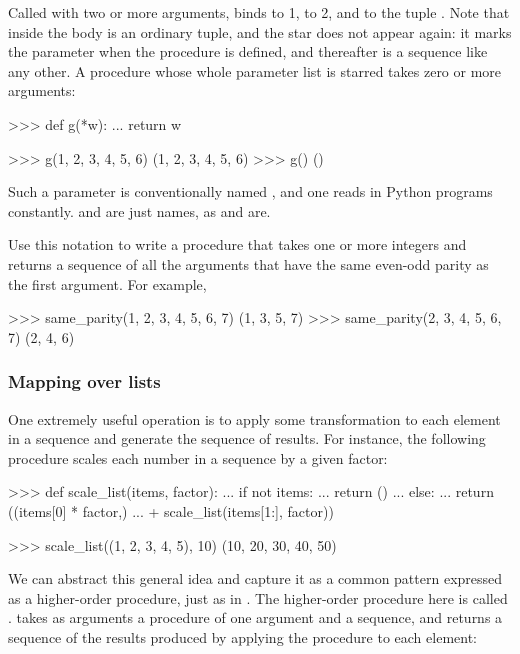 \begin{exerciseGroup}
\noindent
Called with two or more arguments,  binds  to 1,  to 2,
and  to the tuple .  Note that inside the body
 is an ordinary tuple, and the star does not appear again: it marks the
parameter when the procedure is defined, and thereafter  is a sequence
like any other.  A procedure whose whole parameter list is starred takes zero
or more arguments:

\begin{codeBlock}
>>> def g(*w):
...     return w

>>> g(1, 2, 3, 4, 5, 6)
(1, 2, 3, 4, 5, 6)
>>> g()
()
\end{codeBlock}

\noindent
Such a parameter is conventionally named , and one reads
 in Python programs constantly.   and  are just
names, as  and  are.

Use this notation to write a procedure  that takes one or
more integers and returns a sequence of all the arguments that have the same
even-odd parity as the first argument.  For example,

\begin{codeBlock}
>>> same_parity(1, 2, 3, 4, 5, 6, 7)
(1, 3, 5, 7)
>>> same_parity(2, 3, 4, 5, 6, 7)
(2, 4, 6)
\end{codeBlock}
\end{exerciseGroup}

\subsubsection*{Mapping over lists}

One extremely useful operation is to apply some transformation to each element
in a sequence and generate the sequence of results.  For instance, the
following procedure scales each number in a sequence by a given factor:

\begin{codeBlock}
>>> def scale_list(items, factor):
...     if not items:
...         return ()
...     else:
...         return ((items[0] * factor,)
...                 + scale_list(items[1:], factor))

>>> scale_list((1, 2, 3, 4, 5), 10)
(10, 20, 30, 40, 50)
\end{codeBlock}

\noindent
We can abstract this general idea and capture it as a common pattern expressed
as a higher-order procedure, just as in .  The higher-order
procedure here is called .   takes as arguments a procedure
of one argument and a sequence, and returns a sequence of the results produced
by applying the procedure to each element:


